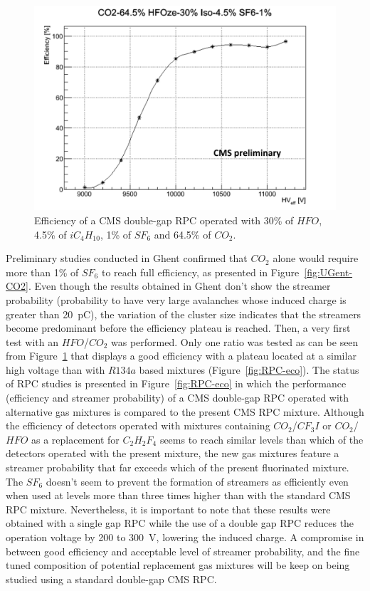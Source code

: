 	\begin{figure}
		\centering
		\includegraphics[width=\linewidth]{fig/chapt3/HFO-UGent.png}
		\caption{\label{fig:UGent-HFO} Efficiency of a CMS double-gap RPC operated with 30\% of $HFO$, 4.5\% of $iC_4H_{10}$, 1\% of $SF_6$ and 64.5\% of $CO_2$.}
	\end{figure}
	
	Preliminary studies conducted in Ghent confirmed that $CO_2$ alone would require more than 1\% of $SF_6$ to reach full efficiency, as presented in Figure~\ref{fig:UGent-CO2}. Even though the results obtained in Ghent don't show the streamer probability (probability to have very large avalanches whose induced charge is greater than \SI{20}{pC}), the variation of the cluster size indicates that the streamers become predominant before the efficiency plateau is reached. Then, a very first test with an $HFO$/$CO_2$ was performed. Only one ratio was tested as can be seen from Figure~\ref{fig:UGent-HFO} that displays a good efficiency with a plateau located at a similar high voltage than with $R134a$ based mixtures (Figure~\ref{fig:RPC-eco}). The status of RPC studies is presented in Figure~\ref{fig:RPC-eco} in which the performance (efficiency and streamer probability) of a CMS double-gap RPC operated with alternative gas mixtures is compared to the present CMS RPC mixture. Although the efficiency of detectors operated with mixtures containing $CO_2$/$CF_3I$ or $CO_2$/$HFO$ as a replacement for $C_2H_2F_4$ seems to reach similar levels than which of the detectors operated with the present mixture, the new gas mixtures feature a streamer probability that far exceeds which of the present fluorinated mixture. The $SF_6$ doesn't seem to prevent the formation of streamers as efficiently even when used at levels more than three times higher than with the standard CMS RPC mixture. Nevertheless, it is important to note that these results were obtained with a single gap RPC while the use of a double gap RPC reduces the operation voltage by 200 to \SI{300}{V}, lowering the induced charge. A compromise in between good efficiency and acceptable level of streamer probability, and the fine tuned composition of potential replacement gas mixtures will be keep on being studied using a standard double-gap CMS RPC.
	

